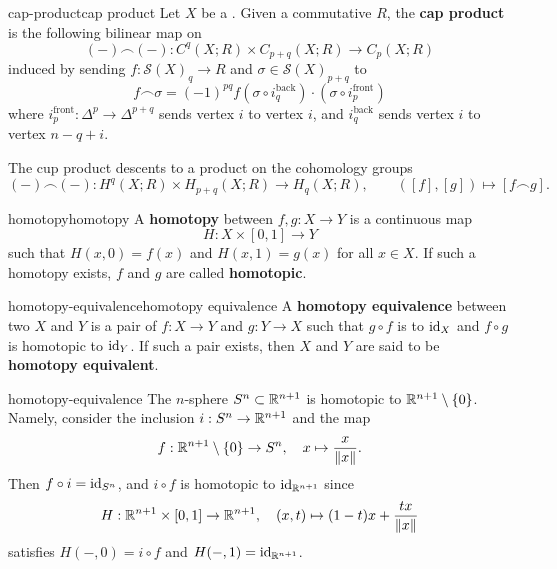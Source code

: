 \begin{topic}{cap-product}{cap product}
    Let $X$ be a . Given a commutative  $R$, the \textbf{cap product} is the following bilinear map on 
    \[ (-) \frown (-) : C^q(X; R) \times C_{p + q}(X; R) \to C_p(X; R) \]
    induced by sending $f : \mathcal{S}(X)_q \to R$ and $\sigma \in \mathcal{S}(X)_{p + q}$ to
    \[ f \frown \sigma = (-1)^{pq} f(\sigma \circ i_q^\text{back}) \cdot (\sigma \circ i_p^\text{front})  \]
    where $i_p^\text{front} : \Delta^{p} \to \Delta^{p + q}$ sends vertex $i$ to vertex $i$, and $i_q^\text{back}$ sends vertex $i$ to vertex $n - q + i$.
    
    The cup product descents to a product on the cohomology groups
    \[ (-) \frown (-) : H^q(X; R) \times H_{p + q}(X; R) \to H_q(X; R), \qquad ([f], [g]) \mapsto [f \frown g] . \]
\end{topic}

\begin{topic}{homotopy}{homotopy}
    A \textbf{homotopy} between  $f, g : X \to Y$ is a continuous map
    \[ H : X \times [0, 1] \to Y \]
    such that $H(x, 0) = f(x)$ and $H(x, 1) = g(x)$ for all $x \in X$. If such a homotopy exists, $f$ and $g$ are called \textbf{homotopic}.
\end{topic}

\begin{topic}{homotopy-equivalence}{homotopy equivalence}
    A \textbf{homotopy equivalence} between two  $X$ and $Y$ is a pair of  $f : X \to Y$ and $g : Y \to X$ such that $g \circ f$ is  to $\text{id}_X$ and $f \circ g$ is homotopic to $\text{id}_Y$. If such a pair exists, then $X$ and $Y$ are said to be \textbf{homotopy equivalent}.
\end{topic}

\begin{example}{homotopy-equivalence}
    The $n$-sphere $S^n \subset \mathbb{R}^{n + 1}$ is homotopic to $\mathbb{R}^{n + 1} \setminus \{ 0 \}$. Namely, consider the inclusion $i : S^n \to \mathbb{R}^{n + 1}$ and the map
    \[ f : \mathbb{R}^{n + 1} \setminus \{ 0 \} \to S^n, \quad x \mapsto \frac{x}{\|x\|} . \]
    Then $f \circ i = \text{id}_{S^n}$, and $i \circ f$ is homotopic to $\text{id}_{\mathbb{R}^{n + 1}}$ since
    \[ H : \mathbb{R}^{n + 1} \times [0, 1] \to \mathbb{R}^{n + 1}, \quad (x, t) \mapsto (1 - t) x + \frac{tx}{\|x\|} \]
    satisfies $H(-, 0) = i \circ f$ and $H(-, 1) = \text{id}_{\mathbb{R}^{n + 1}}$.
\end{example}

